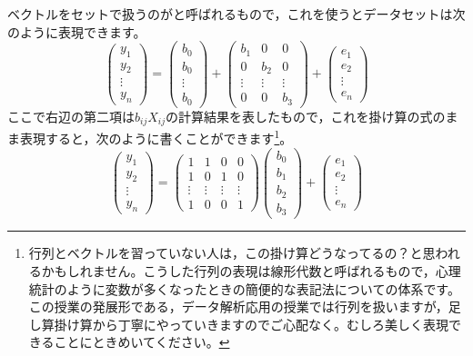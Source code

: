 \documentclass{ltjbook}
\begin{document}
ベクトルをセットで扱うのがと呼ばれるもので，これを使うとデータセットは次のように表現できます。
\[
	\begin{pmatrix} y_1 \\ y_2 \\ \vdots \\ y_n \end{pmatrix}
	=
	\begin{pmatrix} b_0 \\ b_0 \\ \vdots \\ b_0 \end{pmatrix}
	+
	\begin{pmatrix} b_1 & 0 & 0 \\ 0 & b_2 & 0 \\ \vdots &\vdots & \vdots\\ 0 & 0 & b_3 \end{pmatrix}
	+
	\begin{pmatrix} e_1 \\ e_2 \\ \vdots \\ e_n \end{pmatrix}
\]
ここで右辺の第二項は$b_{ij}X_{ij}$の計算結果を表したもので，これを掛け算の式のまま表現すると，次のように書くことができます\footnote{行列とベクトルを習っていない人は，この掛け算どうなってるの？と思われるかもしれません。こうした行列の表現は線形代数と呼ばれるもので，心理統計のように変数が多くなったときの簡便的な表記法についての体系です。この授業の発展形である，データ解析応用の授業では行列を扱いますが，足し算掛け算から丁寧にやっていきますのでご心配なく。むしろ美しく表現できることにときめいてください。}。
\[
	\begin{pmatrix} y_1 \\ y_2 \\ \vdots \\ y_n \end{pmatrix}
	=
	\begin{pmatrix} 1 & 1 & 0 & 0 \\ 1 & 0 & 1 & 0 \\ \vdots  & \vdots & \vdots & \vdots \\ 1 & 0 & 0 & 1 \end{pmatrix}
	\begin{pmatrix} b_0 \\ b_1 \\ b_2 \\ b_3 \end{pmatrix}
	+
	\begin{pmatrix} e_1 \\ e_2 \\ \vdots \\ e_n \end{pmatrix}
\]
\end{document}
